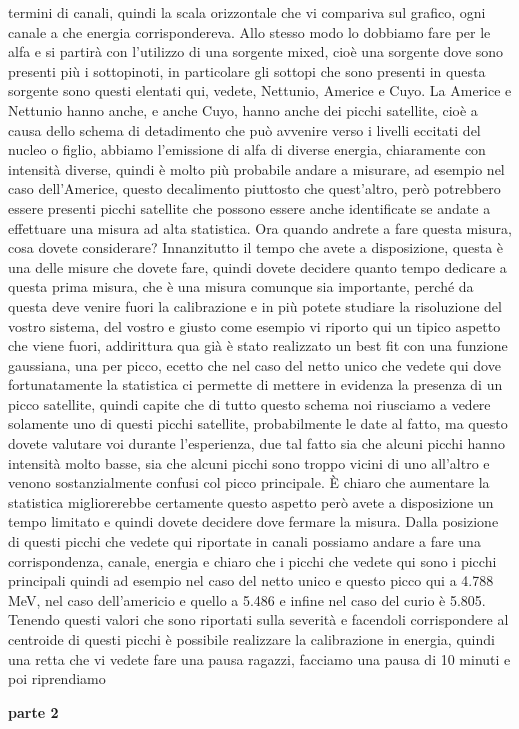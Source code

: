 termini di canali, quindi la scala orizzontale che vi compariva sul grafico, ogni canale a che energia corrispondereva. Allo stesso modo lo dobbiamo fare per le alfa e si partirà con l'utilizzo di una sorgente mixed, cioè una sorgente dove sono presenti più i sottopinoti, in particolare gli sottopi che sono presenti in questa sorgente sono questi elentati qui, vedete, Nettunio, Americe e Cuyo. La Americe e Nettunio hanno anche, e anche Cuyo, hanno anche dei picchi satellite, cioè a causa dello schema di detadimento che può avvenire verso i livelli eccitati del nucleo o figlio, abbiamo l'emissione di alfa di diverse energia, chiaramente con intensità diverse, quindi è molto più probabile andare a misurare, ad esempio nel caso dell'Americe, questo decalimento piuttosto che quest'altro, però potrebbero essere presenti picchi satellite che possono essere anche identificate se andate a effettuare una misura ad alta statistica. Ora quando andrete a fare questa misura, cosa dovete considerare? Innanzitutto il tempo che avete a disposizione, questa è una delle misure che dovete fare, quindi dovete decidere quanto tempo dedicare a questa prima misura, che è una misura comunque sia importante, perché da questa deve venire fuori la calibrazione e in più potete studiare la risoluzione del vostro sistema, del vostro e giusto come esempio vi riporto qui un tipico aspetto che viene fuori, addirittura qua già è stato realizzato un best fit con una funzione gaussiana, una per picco, ecetto che nel caso del netto unico che vedete qui dove fortunatamente la statistica ci permette di mettere in evidenza la presenza di un picco satellite, quindi capite che di tutto questo schema noi riusciamo a vedere solamente uno di questi picchi satellite, probabilmente le date al fatto, ma questo dovete valutare voi durante l'esperienza, due tal fatto sia che alcuni picchi hanno intensità molto basse, sia che alcuni picchi sono troppo vicini di uno all'altro e venono sostanzialmente confusi col picco principale. È chiaro che aumentare la statistica migliorerebbe certamente questo aspetto però avete a disposizione un tempo limitato e quindi dovete decidere dove fermare la misura. Dalla posizione di questi picchi che vedete qui riportate in canali possiamo andare a fare una corrispondenza, canale, energia e chiaro che i picchi che vedete qui sono i picchi principali quindi ad esempio nel caso del netto unico e questo picco qui a 4.788 MeV, nel caso dell'americio e quello a 5.486 e infine nel caso del curio è 5.805. Tenendo questi valori che sono riportati sulla severità e facendoli corrispondere al centroide di questi picchi è possibile realizzare la calibrazione in energia, quindi una retta che vi vedete fare una pausa ragazzi, facciamo una pausa di 10 minuti e poi riprendiamo

\textbf{parte 2}
